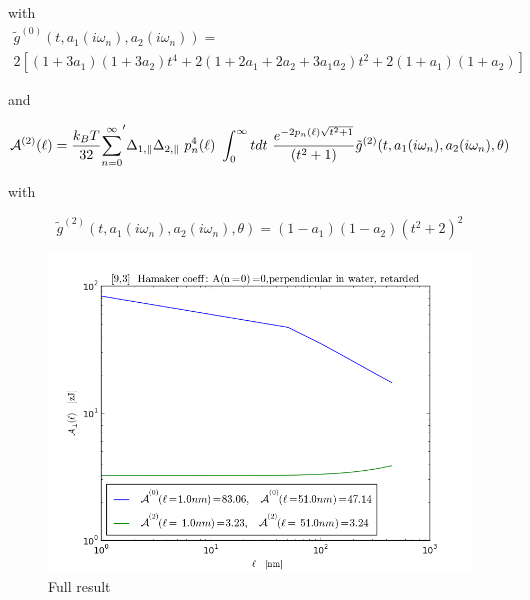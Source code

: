 \documentclass[a4paper]{article}
\begin{document}
\begin{center}
with
\begin{multline*}
\tilde g^{(0)}(t, a_1(i \omega_n), a_2(i \omega_n)) = \\ 
2 \left[ (1+3a_1)(1+3a_2) t^{4} + 2 (1+2a_1+2a_2+3a_1a_2) t^{2}  + 2(1+a_1)(1+a_2)\right]
\end{multline*}



and

\begin{equation}
{\cal A}^{(2)}(\ell) = \frac{k_BT}{32}  {\sum_{n=0}^{\infty}}' \Delta_{1,\parallel} \Delta_{2,\parallel} ~p_n^{4}(\ell) ~\int_0^{\infty} t dt ~\frac{e^{- 2 p_n(\ell) \sqrt{t^{2} + 1}}}{(t^{2} + 1)} \tilde g^{(2)}(t, a_1(i \omega_n), a_2(i \omega_n), \theta)
\end{equation}

with

\begin{equation}
\tilde g^{(2)}(t, a_1(i \omega_n), a_2(i \omega_n), \theta) = (1-a_1)(1-a_2)(t^{2} + 2)^2
\label{befgqw}
\end{equation}

\begin{figure}[t!]
\begin{center}
\includegraphics[width=1.0\textwidth]{plots/140322_93w93_HCs_n0_perpendicular_ret.png}
\hskip 43pt
\caption{Full result}
\label{eiz65}
\end{center}
\end{figure}


\end{center}
\end{document}
